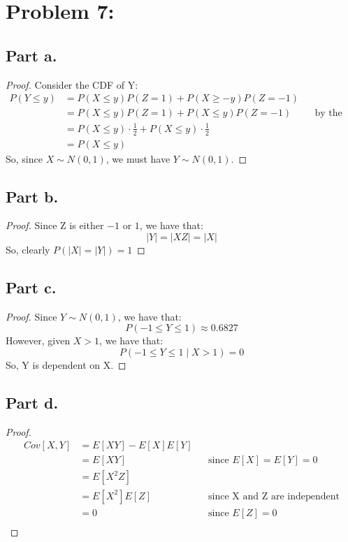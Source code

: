 \documentclass{article}
\begin{document}
\section*{Problem 7:}

\subsection*{Part a.}

\begin{proof}
Consider the CDF of Y:
\begin{align*}
P(Y \leq  y) &= P(X \leq y)P(Z = 1) + P(X \geq - y)P(Z = -1) \\
&= P(X \leq y)P(Z = 1) + P(X \leq y)P(Z = -1) &&\text{by the symmetry of the normal distribution}\\
&= P(X \leq y) \cdot \frac{1}{2} + P(X \leq y) \cdot \frac{1}{2} \\
&= P(X \leq y)
\end{align*}
So, since $X \sim N(0, 1)$, we must have $Y \sim N(0, 1)$.
\end{proof}

\subsection*{Part b.}

\begin{proof}
Since Z is either $-1$ or $1$, we have that:
$$|Y| = |XZ| = |X|$$
So, clearly $P(|X| = |Y|) = 1$
\end{proof}

\subsection*{Part c.}

\begin{proof}
Since $Y \sim N(0, 1)$, we have that:
$$P(-1 \leq Y \leq 1) \approx 0.6827$$
However, given $X > 1$, we have that:
$$P(-1 \leq Y \leq 1 \mid X > 1) = 0$$
So, Y is dependent on X.
\end{proof}

\subsection*{Part d.}
\begin{proof}
\begin{align*}
Cov[X, Y] &= E[XY] - E[X]E[Y] \\
&= E[XY] &&\text{since $E[X] = E[Y] = 0$} \\
&= E[X^2Z] \\
&= E[X^2]E[Z] &&\text{since X and Z are independent} \\
&= 0 &&\text{since $E[Z] = 0$}\\
\end{align*}
\end{proof}
\end{document}
